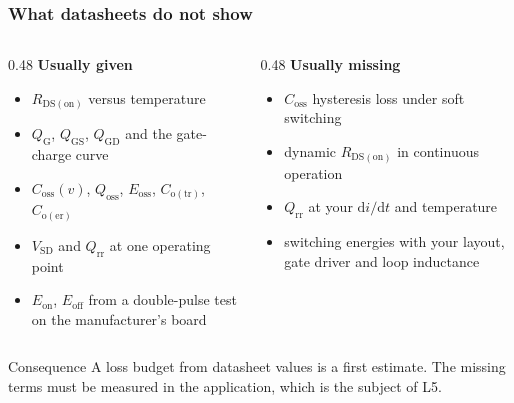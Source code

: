 \begin{frame}
	\frametitle{What datasheets do not show}
	\begin{columns}[T]
		\begin{column}{0.48\textwidth}
			\textbf{Usually given}
			\begin{itemize}
				\item $R_\mathrm{DS(on)}$ versus temperature
				\item $Q_\mathrm{G}$, $Q_\mathrm{GS}$, $Q_\mathrm{GD}$ and the gate-charge curve
				\item $C_\mathrm{oss}(v)$, $Q_\mathrm{oss}$, $E_\mathrm{oss}$, $C_\mathrm{o(tr)}$, $C_\mathrm{o(er)}$
				\item $V_\mathrm{SD}$ and $Q_\mathrm{rr}$ at one operating point
				\item $E_\mathrm{on}$, $E_\mathrm{off}$ from a double-pulse test on the manufacturer's board
			\end{itemize}
		\end{column}
		\begin{column}{0.48\textwidth}
			\textbf{Usually missing}
			\begin{itemize}
				\item $C_\mathrm{oss}$ hysteresis loss under soft switching
				\item dynamic $R_\mathrm{DS(on)}$ in continuous operation
				\item $Q_\mathrm{rr}$ at your $\mathrm{d}i/\mathrm{d}t$ and temperature
				\item switching energies with your layout, gate driver and loop inductance
			\end{itemize}
		\end{column}
	\end{columns}
	\begin{block}{Consequence}
		A loss budget from datasheet values is a first estimate. The missing terms must be measured in the application, which is the subject of L5.
	\end{block}
\end{frame}

